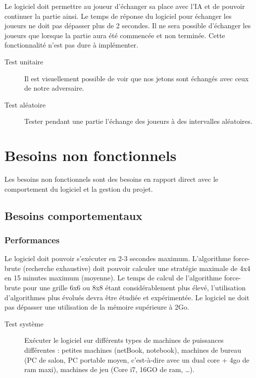 \documentclass[a4paper,12pt]{article}
\begin{document}
Le logiciel doit permettre au joueur d’échanger sa place avec l’IA et de pouvoir continuer la partie ainsi. Le temps de réponse du logiciel pour échanger les joueurs ne doit pas dépasser plus de 2 secondes. Il ne sera possible d'échanger les joueurs que lorsque la partie aura été commencée et non terminée. Cette fonctionnalité n'est pas dure à implémenter.

\begin{description}
\item[Test unitaire] Il est visuellement possible de voir que nos jetons sont échangés avec ceux de notre adversaire.
\item[Test aléatoire] Tester pendant une partie l’échange des joueurs à des intervalles aléatoires.
\end{description}

\section{Besoins non fonctionnels}

Les besoins non fonctionnels sont des besoins en rapport direct avec le comportement du logiciel et la gestion du projet.

\subsection{Besoins comportementaux}

\subsubsection{Performances}

Le logiciel doit pouvoir s'exécuter en 2-3 secondes maximum. L'algorithme force-brute (recherche exhaustive) doit pouvoir calculer une stratégie maximale de 4x4 en 15 minutes maximum (moyenne). Le temps de calcul de l'algorithme force-brute pour une grille 6x6 ou 8x8 étant considérablement plus élevé, l'utilisation d'algorithmes plus évolués devra être étudiée et expérimentée. Le logiciel ne doit pas dépasser une utilisation de la mémoire supérieure à 2Go.

\begin{description}
\item[Test système] Exécuter le logiciel sur différents types de machines de puissances différentes : petites machines (netBook, notebook), machines de bureau (PC de salon, PC portable moyen, c’est-à-dire avec un dual core + 4go de ram maxi), machines de jeu (Core i7, 16GO de ram, …).
\end{description}
\end{document}
